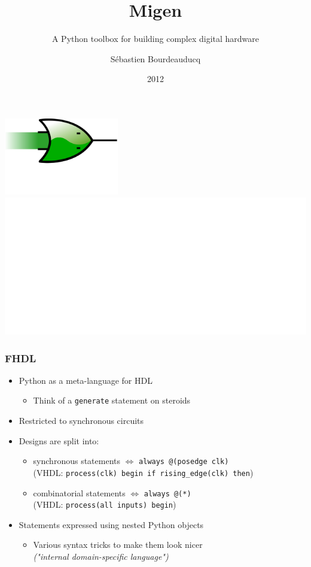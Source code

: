 \documentclass[serif,mathserif]{beamer}
\author{S\'ebastien Bourdeauducq}
\title{Migen}
\subtitle{A Python toolbox for building complex digital hardware}
\date{2012}
\begin{document}
\maketitle

\begin{frame}
\begin{centering}
\includegraphics[width=5cm]{migen_logo.png} \\
\includegraphics[width=\textwidth]{migenblock.png}
\end{centering}
\end{frame}

\begin{frame}[fragile]
\frametitle{FHDL}
\begin{itemize}
\item Python as a meta-language for HDL
\begin{itemize}
\item Think of a \verb!generate! statement on steroids
\end{itemize}
\item Restricted to synchronous circuits
\item Designs are split into:
\begin{itemize}
\item synchronous statements $\Longleftrightarrow$ \verb!always @(posedge clk)! \\
(VHDL: \verb!process(clk) begin if rising_edge(clk) then!)
\item combinatorial statements $\Longleftrightarrow$ \verb!always @(*)! \\
(VHDL: \verb!process(all inputs) begin!)
\end{itemize}
\item Statements expressed using nested Python objects
\begin{itemize}
\item Various syntax tricks to make them look nicer \\
\textit{("internal domain-specific language")}
\end{itemize}
\end{itemize}
\end{frame}
\end{document}
